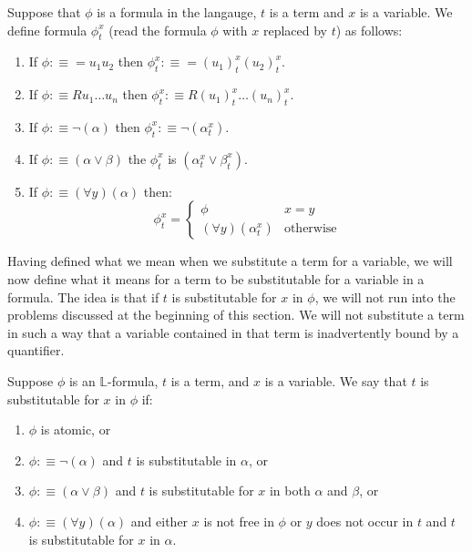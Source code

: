 \documentclass[9pt,a4paper, twocolumn]{article}
\newcommand{\curveL}{\mathbb{L} }
\begin{document}
            \begin{define}
                Suppose that $\phi$ is a formula in the langauge, $t$ is a term and $x$ is a variable. We define formula $\phi_t^x$ (read the formula $\phi$ with $x$ replaced by $t$) as follows:
                \begin{enumerate}
                    \item If $\phi:\equiv =u_1u_2$ then $\phi_t^x:\equiv = (u_1)_t^x(u_2)_t^x$.
                    \item If $\phi:\equiv Ru_1\dots u_n$ then $\phi_t^x :\equiv R(u_1)_t^x\dots (u_n)_t^x$.
                    \item If $\phi:\equiv \neg(\alpha)$ then $\phi_t^x:\equiv \neg(\alpha_t^x)$.
                    \item If $\phi:\equiv (\alpha\lor\beta)$ the $\phi_t^x$ is $(\alpha_t^x\lor\beta_t^x)$.
                    \item If $\phi:\equiv (\forall y)(\alpha)$ then:
                    $$
                    \phi_t^x = \left\{ \begin{matrix} \phi & x = y \\ (\forall y)(\alpha_t^x) &\text{otherwise}\end{matrix} \right.
                    $$
                \end{enumerate}
            \end{define}
            Having defined what we mean when we substitute a term for a variable, we will now define what it means for a term to be substitutable for a variable in a formula. The idea is that if $t$ is substitutable for $x$ in $\phi$, we will not run into the problems discussed at the beginning of this section. We will not substitute a term in such a way that a variable contained in that term is inadvertently bound by a quantifier.
            \begin{define}
                Suppose $\phi$ is an $\curveL$-formula, $t$ is a term, and $x$ is a variable. We say that $t$ is substitutable for $x$ in $\phi$ if:
                \begin{enumerate}
                    \item $\phi$ is atomic, or
                    \item $\phi:\equiv \neg(\alpha)$ and $t$ is substitutable in $\alpha$, or
                    \item $\phi:\equiv (\alpha\lor\beta)$ and $t$ is substitutable for $x$ in both $\alpha$ and $\beta$, or
                    \item $\phi:\equiv (\forall y)(\alpha)$ and either $x$ is not free in $\phi$ or $y$ does not occur in $t$ and $t$ is substitutable for $x$ in $\alpha$.
                \end{enumerate}
            \end{define}
\end{document}
